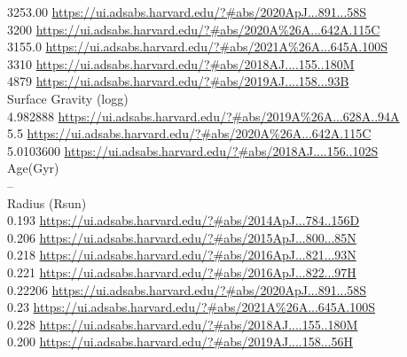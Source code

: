 3253.00 \url{https://ui.adsabs.harvard.edu/?#abs/2020ApJ...891...58S}\\
3200 \url{https://ui.adsabs.harvard.edu/?#abs/2020A%26A...642A.115C}\\
3155.0 \url{https://ui.adsabs.harvard.edu/?#abs/2021A%26A...645A.100S}\\
3310 \url{https://ui.adsabs.harvard.edu/?#abs/2018AJ....155..180M}\\
4879 \url{https://ui.adsabs.harvard.edu/?#abs/2019AJ....158...93B}\\
Surface Gravity (logg)\\
4.982888 \url{https://ui.adsabs.harvard.edu/?#abs/2019A%26A...628A..94A}\\
5.5 \url{https://ui.adsabs.harvard.edu/?#abs/2020A%26A...642A.115C}\\
5.0103600 \url{https://ui.adsabs.harvard.edu/?#abs/2018AJ....156..102S}\\
Age(Gyr)\\
--\\
Radius (Rsun)\\
0.193 \url{https://ui.adsabs.harvard.edu/?#abs/2014ApJ...784..156D}\\
0.206 \url{https://ui.adsabs.harvard.edu/?#abs/2015ApJ...800...85N}\\
0.218 \url{https://ui.adsabs.harvard.edu/?#abs/2016ApJ...821...93N}\\
0.221 \url{https://ui.adsabs.harvard.edu/?#abs/2016ApJ...822...97H}\\
0.22206 \url{https://ui.adsabs.harvard.edu/?#abs/2020ApJ...891...58S}\\
0.23 \url{https://ui.adsabs.harvard.edu/?#abs/2021A%26A...645A.100S}\\
0.228 \url{https://ui.adsabs.harvard.edu/?#abs/2018AJ....155..180M}\\
0.200 \url{https://ui.adsabs.harvard.edu/?#abs/2019AJ....158...56H}\\